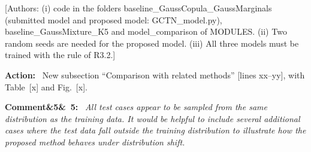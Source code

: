 \documentclass[11pt]{article}
\newenvironment{rcomment}[1]{\par\bigskip\noindent\textbf{Comment\ifx&#1&\else\ #1\fi:}\ \itshape}{\par}
\newenvironment{action}{\par\smallskip\noindent\color{resp}\textbf{Action:}\ }{\par}
\newcommand{\authornote}[1]{\textcolor{note}{\textsf{[Authors: #1]}}}
\newcommand{\tbd}[1]{\textcolor{note}{\textsf{[#1]}}}
\newcommand{\lines}[1]{\tbd{lines #1}}
\begin{document}
\authornote{(i) code in the folders baseline\_GaussCopula\_GaussMarginals (submitted model and proposed model:
GCTN\_model.py), baseline\_GaussMixture\_K5 and model\_comparison of MODULES. (ii) Two random seeds are needed for the proposed model. (iii) All three models must be trained with the rule of R3.2.}

\begin{action}
New subsection ``Comparison with related methods'' \lines{xx--yy}, with Table~\tbd{x} and Fig.~\tbd{x}.
\end{action}

\begin{rcomment}{5}
All test cases appear to be sampled from the same distribution as the training data. It would be helpful to include
several additional cases where the test data fall outside the training distribution to illustrate how the proposed
method behaves under distribution shift.
\end{rcomment}
\end{document}
